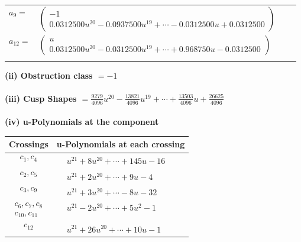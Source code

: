 \documentclass[1p]{elsarticle_modified}
\theoremstyle{definition}
\begin{document}
\begin{tabular}{m{7pt} m{180pt} m{7pt} m{180pt} }
\flushright $a_{9}=$&$\begin{pmatrix}-1\\0.0312500 u^{20}-0.0937500 u^{19}+\cdots-0.0312500 u+0.0312500\end{pmatrix}$ \\
\flushright $a_{12}=$&$\begin{pmatrix}u\\0.0312500 u^{20}-0.0312500 u^{19}+\cdots+0.968750 u-0.0312500\end{pmatrix}$\\&\end{tabular}
\flushleft \textbf{(ii) Obstruction class $= -1$}\\~\\
\flushleft \textbf{(iii) Cusp Shapes $= \frac{9279}{4096} u^{20}-\frac{13821}{4096} u^{19}+\cdots+\frac{13503}{4096} u+\frac{26625}{4096}$}\\~\\
\newpage\renewcommand{\arraystretch}{1}
\flushleft \textbf{(iv) u-Polynomials at the component}\newline \\
\begin{tabular}{m{50pt}|m{274pt}}
Crossings & \hspace{64pt}u-Polynomials at each crossing \\
\hline $$\begin{aligned}c_{1},c_{4}\end{aligned}$$&$\begin{aligned}
&u^{21}+8 u^{20}+\cdots+145 u-16
\end{aligned}$\\
\hline $$\begin{aligned}c_{2},c_{5}\end{aligned}$$&$\begin{aligned}
&u^{21}+2 u^{20}+\cdots+9 u-4
\end{aligned}$\\
\hline $$\begin{aligned}c_{3},c_{9}\end{aligned}$$&$\begin{aligned}
&u^{21}+3 u^{20}+\cdots-8 u-32
\end{aligned}$\\
\hline $$\begin{aligned}c_{6},c_{7},c_{8}\\c_{10},c_{11}\end{aligned}$$&$\begin{aligned}
&u^{21}-2 u^{20}+\cdots+5 u^2-1
\end{aligned}$\\
\hline $$\begin{aligned}c_{12}\end{aligned}$$&$\begin{aligned}
&u^{21}+26 u^{20}+\cdots+10 u-1
\end{aligned}$\\
\hline
\end{tabular}\\~\\
\end{document}
